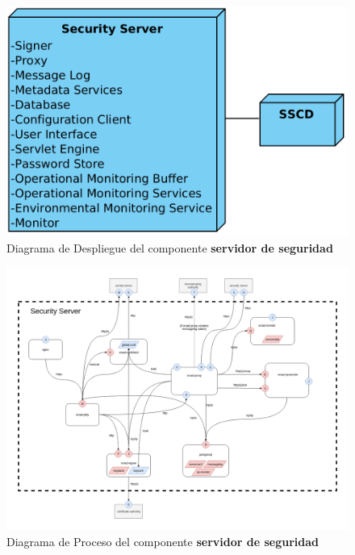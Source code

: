 \begin{figure}[h!]
    \centering
    \includegraphics[scale=0.5]{Pictures/arc-ss_simple_security_server_deployment.png}
    \caption{Diagrama de Despliegue del componente \textbf{servidor de seguridad}}
    \label{fig:SSDD}
\end{figure}
\begin{figure}[h!]
    \centering
    \includegraphics[scale=0.2]{Pictures/arc-ss_security_server_process_diagram.png}
    \caption{Diagrama de Proceso del componente \textbf{servidor de seguridad}}
    \label{fig:SSDP}
\end{figure}
